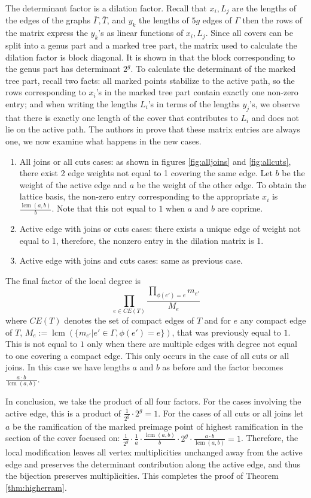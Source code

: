 \documentclass[11pt,reqno]{amsart}
\theoremstyle{definition}
\DeclareMathOperator{\lcm}{lcm}
\begin{document}
The determinant factor is a dilation factor. Recall that $x_i, L_j$  are the lengths of the edges of the graphs $\overline{\Gamma}, \overline{T}$, and $y_k$ the lengths of $5g$ edges of $\Gamma$ then the rows of the matrix express the $y_k$'s as linear functions of $x_i, L_j$. Since all covers can be split into a genus part  and a marked tree part, the matrix used to calculate the dilation factor is block diagonal. It is shown in \cite{troptev} that the block corresponding to the genus part has determinant $2^g$. To calculate the determinant of the marked tree part, recall two facts: all marked points stabilize to the active path, so the rows corresponding to $x_i$'s in the marked tree part contain exactly one non-zero entry; and when writing the lengths $L_i$'s in terms of the lengths $y_j$'s, we observe that there is exactly one length of the cover that contributes to $L_i$ and does not lie on the active path. The authors in \cite{troptev} prove that these matrix entries are always one, we now examine what happens in the new cases. 
\begin{enumerate}
    \item All joins or all cuts cases: as shown in figures \ref{fig:alljoins} and \ref{fig:allcuts}, there exist 2 edge weights not equal to 1 covering the same edge. Let $b$ be the weight of the active edge and $a$ be the weight of the other edge. To obtain the lattice basis, the non-zero entry corresponding to the appropriate $x_i$ is $\frac{\lcm(a,b)}{b}$. Note that this not equal to $1$ when $a$ and $b$ are coprime.
    \item Active edge with joins or cuts cases: there exists a unique edge of weight not equal to 1, therefore, the nonzero entry in the dilation matrix is 1.
    \item Active edge with joins and cuts cases: same as previous case.
\end{enumerate}

The final factor of the local degree is \[\prod_{e\in CE(T)}\frac{\prod_{\phi(e') = e}m_{e'}}{M_e}\]
where $CE(T)$ denotes the set of compact edges of $T$ and for $e$ any compact edge of $T$, $M_e:=\lcm(\{m_{e'}| e'\in \Gamma, \phi(e')=e\})$, that was previously equal to $1$. This is not equal to $1$ only when there are multiple edges with degree not equal to one covering a compact edge. This only occurs in the case of all cuts or all joins. In this case we have lengths $a$ and $b$ as before and the factor becomes $\frac{a\cdot b}{\lcm(a,b)}$. 

In conclusion, we take the product of all four factors. For the cases involving the active edge, this is a product of $\frac{1}{2^g}\cdot2^g=1$. For the cases of all cuts or all joins let $a$ be the ramification of the marked preimage point of highest ramification in the section of the cover focused on: $\frac{1}{2^g}\cdot \frac{1}{a}\cdot \frac{\lcm(a,b)}{b}\cdot 2^g \cdot  \frac{a\cdot b}{\lcm(a,b)}=1$. Therefore, the local modification leaves all vertex multiplicities unchanged away from the
active edge and preserves the determinant contribution along the active edge, and thus the
bijection preserves multiplicities. This completes the proof of Theorem \ref{thm:higherram}.
 


\end{document}
